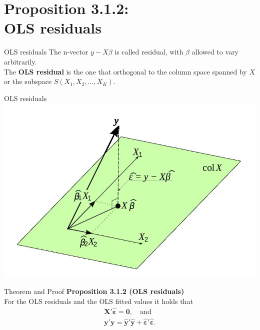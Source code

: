 \documentclass[10pt]{beamer}
\begin{document}
\section {Proposition 3.1.2: \\OLS residuals}

\begin{frame}[fragile]{OLS residuals}
  The n-vector \boldmath$y-X\beta$ is called residual, with \boldmath$\beta$ allowed to vary arbitrarily.\\
  The \textbf{OLS residual} is the one that orthogonal to the column space spanned by \boldmath$X$ or the subspace \boldmath$S(X_{1}, X_{2}, \dots, X_{K})$.
\end{frame}

\begin{frame}[fragile]{OLS residuals}
        \centering
        \includegraphics[width=\textwidth]{OLS.jpg}
        \caption{OLS geometric interpretation.}
\end{frame}

\begin{frame}[fragile]{Theorem and Proof}
  \textbf{Proposition 3.1.2 (OLS residuals)}\\
  For the OLS residuals and the OLS fitted values it holds that\\
\begin{align*}
    \mathbf{X}'\hat{\boldsymbol{\varepsilon}} = \mathbf{0}, \quad\text{and}\\
    \mathbf{y}'\mathbf{y} = \hat{\mathbf{y}}'\hat{\mathbf{y}}+\hat{\boldsymbol{\varepsilon}}'\hat{\boldsymbol{\varepsilon}}.
\end{align*}
\end{frame}
\end{document}
